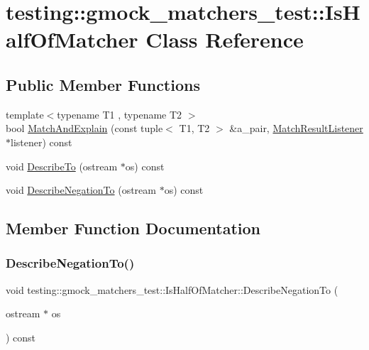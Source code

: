 \hypertarget{classtesting_1_1gmock__matchers__test_1_1_is_half_of_matcher}{}\section{testing\+:\+:gmock\+\_\+matchers\+\_\+test\+:\+:Is\+Half\+Of\+Matcher Class Reference}
\label{classtesting_1_1gmock__matchers__test_1_1_is_half_of_matcher}
\subsection*{Public Member Functions}
\begin{DoxyCompactItemize}
\item 
{\footnotesize template$<$typename T1 , typename T2 $>$ }\\bool \hyperlink{classtesting_1_1gmock__matchers__test_1_1_is_half_of_matcher_a8c919d71f6f7e05ac76c67f37107808c}{Match\+And\+Explain} (const tuple$<$ T1, T2 $>$ \&a\+\_\+pair, \hyperlink{classtesting_1_1_match_result_listener}{Match\+Result\+Listener} $\ast$listener) const
\item 
void \hyperlink{classtesting_1_1gmock__matchers__test_1_1_is_half_of_matcher_aaf62b9984288cc339599286352d82e91}{Describe\+To} (ostream $\ast$os) const
\item 
void \hyperlink{classtesting_1_1gmock__matchers__test_1_1_is_half_of_matcher_a759ba45c89acfa77a4e1afe95e7b768d}{Describe\+Negation\+To} (ostream $\ast$os) const
\end{DoxyCompactItemize}


\subsection{Member Function Documentation}
\mbox{\label{classtesting_1_1gmock__matchers__test_1_1_is_half_of_matcher_a759ba45c89acfa77a4e1afe95e7b768d}} 
\subsubsection{\texorpdfstring{Describe\+Negation\+To()}{DescribeNegationTo()}}
{\footnotesize\ttfamily void testing\+::gmock\+\_\+matchers\+\_\+test\+::\+Is\+Half\+Of\+Matcher\+::\+Describe\+Negation\+To (\begin{DoxyParamCaption}\item[{ostream $\ast$}]{os }\end{DoxyParamCaption}) const\hspace{0.3cm}{\ttfamily [inline]}}

